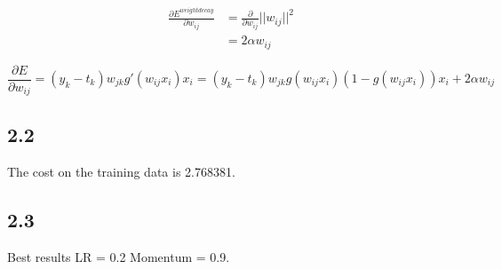 \documentclass{article}
\begin{document}
\begin{align*}
	\frac{\partial E^{weightdecay}}{\partial w_{ij}} &= \frac{\partial}{\partial w_{ij}} ||w_{ij}||^2 \\&= 2\alpha w_{ij}
\end{align*}

\begin{equation}
\frac{\partial E}{\partial w_{ij}} = (y_k-t_k)w_{jk} g'(w_{ij}x_i) x_i = (y_k-t_k)w_{jk}g(w_{ij}x_i)(1-g(w_{ij}x_i))x_i+2\alpha w_{ij}
\end{equation}

\subsection*{2.2}



The cost on the training data is 2.768381.

\subsection*{2.3}

Best results LR = 0.2 Momentum = 0.9.
\end{document}
